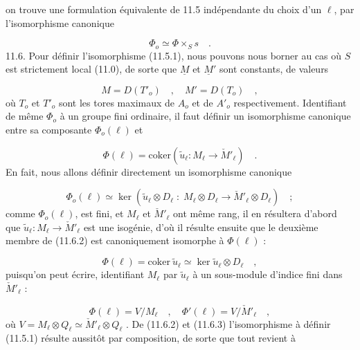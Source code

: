 on trouve une formulation équivalente de 11.5 indépendante du choix d'un $\ell$, par l'isomorphisme canonique

\begin{equation}\tag{11.5.3}
\Phi_o \simeq \Phi \times_S s \quad .
\end{equation}
11.6. Pour définir l'isomorphisme (11.5.1), nous pouvons nous borner au cas où $S$ est strictement local (11.0), de sorte que $\underline{M}$ et $\underline{M}'$ sont constants, de valeurs

\begin{equation}\tag{11.6.1}
M = D(T'_o) \quad , \quad M' = D(T_o) \quad ,
\end{equation}
où $T_o$ et $T'_o$ sont les tores maximaux de $A_o$ et de $A'_o$ respectivement. Identifiant de même $\Phi_o$ à un groupe fini ordinaire, il faut définir un isomorphisme canonique entre sa composante $\Phi_o(\ell)$ et

\begin{equation*}
\Phi(\ell) = \mathrm{coker}(\widetilde{u}_{\ell} : M_{\ell} \longrightarrow \check{M}'_{\ell}) \quad .
\end{equation*}
En fait, nous allons définir directement un isomorphisme canonique

\begin{equation}\tag{11.6.2}
\Phi_o(\ell) \simeq \ker(\widetilde{u}_{\ell}\otimes D_{\ell} \; : \; M_{\ell}\otimes D_{\ell} \longrightarrow \check{M}'_{\ell}\otimes D_{\ell}) \quad ;
\end{equation}
comme $\Phi_o(\ell)$, est fini, et $M_{\ell}$ et $\check{M}'_{\ell}$ ont même rang, il en résultera d'abord que $\widetilde{u}_{\ell} : M_{\ell} \longrightarrow \check{M}'_{\ell}$ est une isogénie, d'où il résulte ensuite que le deuxième membre de (11.6.2) est canoniquement isomorphe à $\Phi(\ell)$ :

\begin{equation}\tag{11.6.3}
\Phi(\ell) = \mathrm{coker}\ \widetilde{u}_{\ell} \simeq \ker \widetilde{u}_{\ell}\otimes D_{\ell} \quad ,
\end{equation}
puisqu'on peut écrire, identifiant $M_{\ell}$ par $\widetilde{u}_{\ell}$ à un sous-module d'indice fini dans $\check{M}'_{\ell}$ :

\begin{equation*}
\Phi(\ell) = V/M_{\ell} \quad , \quad \Phi'(\ell) = V/\check{M}'_{\ell} \quad ,
\end{equation*}
où $V = M_{\ell}\otimes Q_{\ell} \simeq \check{M}'_{\ell}\otimes Q_{\ell}$ . De (11.6.2) et (11.6.3) l'isomorphisme à définir (11.5.1) résulte aussitôt par composition, de sorte que tout revient à


